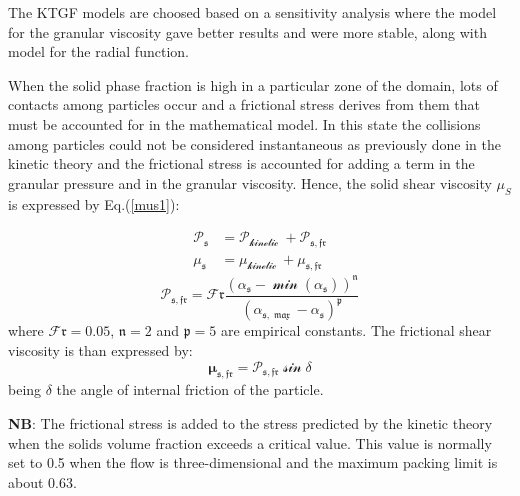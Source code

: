 \documentclass[11pt]{report}
\begin{document}
The KTGF models are choosed based on a sensitivity analysis where the \citet{symlal1993} model for the granular viscosity gave better results and were more stable, along with \citet{sinclair-1989} model for the radial function.

When the solid phase fraction is high in a particular zone of the domain, lots of contacts among particles occur and a frictional stress derives from them that must be accounted for in the mathematical model. In this state the collisions among particles could not be considered instantaneous as previously done in the kinetic theory and the frictional stress is accounted for adding a term in the granular pressure and in the granular viscosity. Hence, the solid shear viscosity $\mu_S$ is expressed by Eq.(\ref{mus1}):

\begin{equation}
\begin{aligned}
\boldsymbol{\mathcal{P_\mathfrak{{s}}}} &=\mathcal{P_{\text {kinetic }}+P_\mathfrak{{s, fr}}} \\
\boldsymbol{\mathcal{\mu_\mathfrak{{s}}}} &=\mathcal{\mu_{\text {kinetic }}+\mu_\mathfrak{{s, fr}}}
\label{mus1}
\end{aligned}
\end{equation}
\begin{equation}
\boldsymbol{\mathcal{P_\mathfrak{{s, fr}}}}=\mathcal{F}\mathfrak{r} \frac{\left(\mathcal{\alpha}_\mathfrak{s}-\mathcal{\min \left(\alpha_\mathfrak{s}\right)}\right)^\mathfrak{n}}{\mathcal{\left(\alpha_\mathfrak{s, \max }-\alpha_\mathfrak{s}\right)^\mathfrak{p}}}
\end{equation}
where  $\boldsymbol{\mathcal{F}\mathfrak{r}}=0.05$, $\boldsymbol{\mathfrak{n}}=2$ and $\boldsymbol{\mathfrak{p}}=5$ are empirical constants. The frictional shear viscosity is than expressed by:
\begin{equation}
\mathcal{\boldsymbol{\mu_\mathfrak{{s, fr}}}=P_\mathfrak{{s, fr}} \sin \delta}
\end{equation}
being $\mathfrak{\delta}$ the angle of internal friction of the particle.

{\bf NB}: The frictional stress is added to the stress predicted by the kinetic theory when the solids volume fraction exceeds a critical value. This value is normally set to 0.5 when the flow is three-dimensional and the maximum packing limit is about 0.63.
\end{document}

